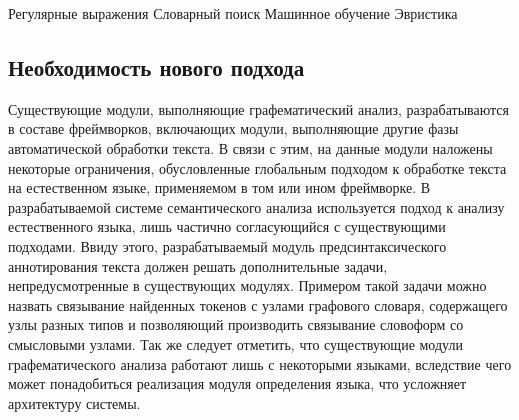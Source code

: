 Регулярные выражения
Словарный поиск
Машинное обучение
Эвристика

\subsection{Необходимость нового подхода}
Существующие модули, выполняющие графематический анализ, разрабатываются в составе фреймворков, включающих модули, выполняющие другие фазы автоматической обработки текста. В связи с этим, на данные модули наложены некоторые ограничения, обусловленные глобальным подходом к обработке текста на естественном языке, применяемом в том или ином фреймворке. В разрабатываемой системе семантического анализа используется подход к анализу естественного языка, лишь частично согласующийся с существующими подходами. Ввиду этого, разрабатываемый модуль предсинтаксического аннотирования текста должен решать дополнительные задачи, непредусмотренные в существующих модулях. Примером такой задачи можно назвать связывание найденных токенов с узлами графового словаря, содержащего узлы разных типов и позволяющий производить связывание словоформ со смысловыми узлами. Так же следует отметить, что существующие модули графематического анализа работают лишь с некоторыми языками, вследствие чего может понадобиться реализация модуля определения языка, что усложняет архитектуру системы.